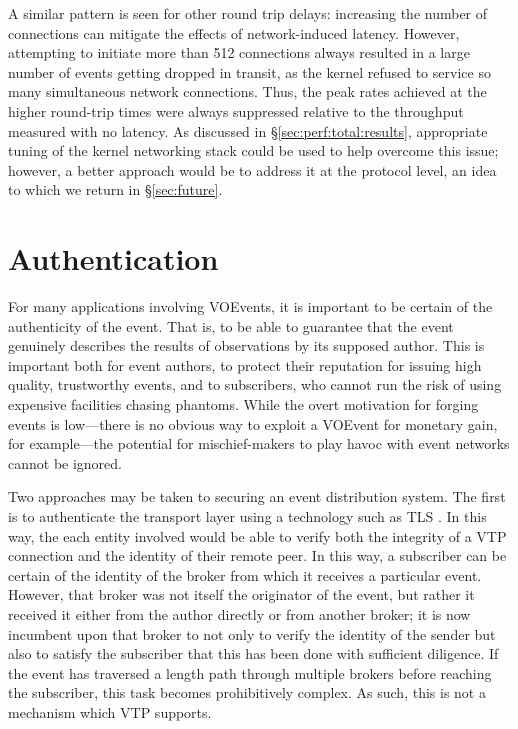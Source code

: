 \documentclass[5p,authoryear]{elsarticle}
\begin{document}
A similar pattern is seen for other round trip delays: increasing the number
of connections can mitigate the effects of network-induced latency. However,
attempting to initiate more than 512 connections always resulted in a large
number of events getting dropped in transit, as the kernel refused to service
so many simultaneous network connections. Thus, the peak rates achieved at the
higher round-trip times were always suppressed relative to the throughput
measured with no latency. As discussed in \S\ref{sec:perf:total:results},
appropriate tuning of the kernel networking stack could be used to help
overcome this issue; however, a better approach would be to address it at the
protocol level, an idea to which we return in \S\ref{sec:future}.

\section{Authentication}
\label{sec:security}

For many applications involving VOEvents, it is important to be certain of the
authenticity of the event. That is, to be able to guarantee that the event
genuinely describes the results of observations by its supposed author. This
is important both for event authors, to protect their reputation for issuing
high quality, trustworthy events, and to subscribers, who cannot run the risk
of using expensive facilities chasing phantoms. While the overt motivation for
forging events is low---there is no obvious way to exploit a VOEvent for
monetary gain, for example---the potential for mischief-makers to play havoc
with event networks cannot be ignored.

Two approaches may be taken to securing an event distribution system. The
first is to authenticate the transport layer using a technology such as TLS
\citep{Dierks:2008}. In this way, the each entity involved would be able to
verify both the integrity of a VTP connection and the identity of their remote
peer. In this way, a subscriber can be certain of the identity of the broker
from which it receives a particular event. However, that broker was not itself
the originator of the event, but rather it received it either from the author
directly or from another broker; it is now incumbent upon that broker to not
only to verify the identity of the sender but also to satisfy the subscriber
that this has been done with sufficient diligence. If the event has traversed
a length path through multiple brokers before reaching the subscriber, this
task becomes prohibitively complex. As such, this is not a mechanism which VTP
supports.
\end{document}
